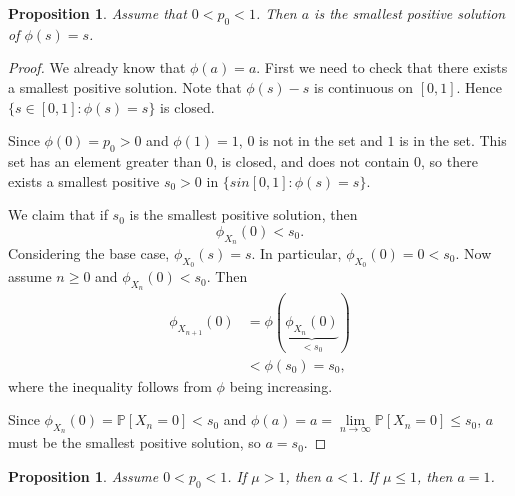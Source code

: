 \documentclass{tufte-handout}
\renewcommand*\P{\mathbb{P}}
\newtheorem{prop}[thm]{Proposition}
\theoremstyle{definition}
\begin{document}
\begin{prop}
	Assume that $0 < p_0 < 1$. Then $a$ is the smallest positive solution of $\phi(s) = s$.
\end{prop}
\begin{proof}
	We already know that $\phi(a) = a$. First we need to check that there exists a smallest positive solution. Note that $\phi(s) - s$ is continuous on $[0,1]$. Hence $\{s \in [0,1]: \phi(s) = s\}$ is closed.

	Since $\phi(0) = p_0 > 0$ and $\phi(1) = 1$, $0$ is not in the set and $1$ is in the set. This set has an element greater than $0$, is closed, and does not contain $0$, so there exists a smallest positive $s_0 > 0$ in $\{s in [0,1] : \phi(s) = s\}$. 

	We claim that if $s_0$ is the smallest positive solution, then \[
		\phi_{X_n}(0) < s_0
	.\] Considering the base case, $\phi_{X_0}(s) = s$. In particular, $\phi_{X_0}(0) = 0 < s_0$. Now assume $n \ge 0$ and $\phi_{X_n}(0) < s_0$. Then 
	\begin{align*}
		\phi_{X_{n+1}}(0) &= \phi\left( \underbrace{\phi_{X_n}(0)}_{< s_0} \right) \\
						  &< \phi(s_0) = s_0
	,\end{align*}
	where the inequality follows from $\phi$ being increasing.

	Since $\phi_{X_n}(0) = \P\left[X_n = 0\right] < s_0$ and $\phi(a) = a = \lim\limits_{n \to \infty} \P\left[X_n = 0\right]  \le s_0$, $a$ must be the smallest positive solution, so $a = s_0$.
\end{proof}
\begin{prop}
	Assume $0 < p_0 < 1$. If $\mu > 1$, then $a < 1$. If $\mu \le 1$, then $a = 1$.
\end{prop}
\end{document}
